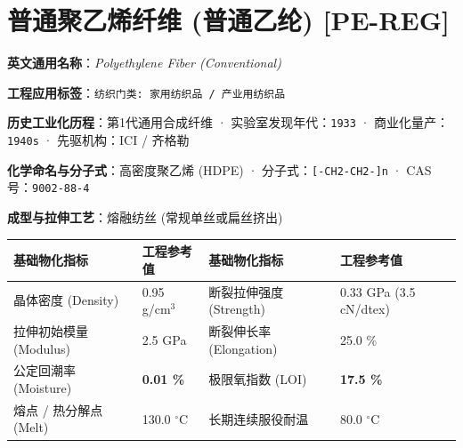 \documentclass[11pt,openright,twoside,UTF8]{ctexbook}
\begin{document}
\section{普通聚乙烯纤维 (普通乙纶) [PE-REG]}
\label{sec:pe-reg}

\noindent\textbf{英文通用名称}：\textit{Polyethylene Fiber (Conventional)}\par
\noindent\textbf{工程应用标签}：\texttt{纺织门类: 家用纺织品 / 产业用纺织品}\par
\noindent\textbf{历史工业化历程}：第1代通用合成纤维 · 实验室发现年代：\texttt{1933} · 商业化量产：\texttt{1940s} · 先驱机构：ICI / 齐格勒\par
\noindent\textbf{化学命名与分子式}：高密度聚乙烯 (HDPE) · 分子式：\texttt{[-CH2-CH2-]n} · CAS 号：\texttt{9002-88-4}\par
\noindent\textbf{成型与拉伸工艺}：熔融纺丝 (常规单丝或扁丝挤出)\par

\vspace{0.15cm}
\begin{center}
\small
\begin{tabularx}{\textwidth}{p{3.8cm}Xp{3.8cm}X}
\toprule
\textbf{基础物化指标} & \textbf{工程参考值} & \textbf{基础物化指标} & \textbf{工程参考值} \\
\midrule
晶体密度 (Density) & 0.95 g/cm$^3$ & 断裂拉伸强度 (Strength) & 0.33 GPa (3.5 cN/dtex) \\
拉伸初始模量 (Modulus) & 2.5 GPa & 断裂伸长率 (Elongation) & 25.0 \% \\
公定回潮率 (Moisture) & \textbf{0.01 \%} & 极限氧指数 (LOI) & \textbf{17.5 \%} \\
熔点 / 热分解点 (Melt) & 130.0 $^\circ\mathrm{C}$ & 长期连续服役耐温 & 80.0 $^\circ\mathrm{C}$ \\
\bottomrule
\end{tabularx}
\end{center}
\vspace{0.15cm}
\end{document}
